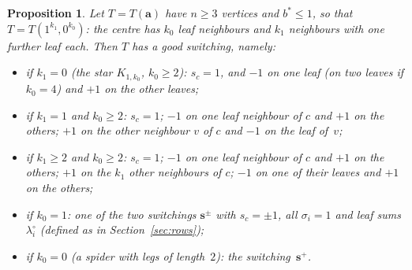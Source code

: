 \documentclass[11pt]{article}
\numberwithin{equation}{section}
\newtheorem{proposition}[lemma]{Proposition}
\theoremstyle{remark}
\newcommand{\s}{\mathbf s}
\newcommand{\bfa}{\mathbf a}
\begin{document}
\begin{proposition}\label{prop:small}
Let $T=T(\bfa)$ have $n\ge3$ vertices and $b^*\le1$, so that
$T=T(1^{k_1},0^{k_0})$: the centre has $k_0$ leaf neighbours and $k_1$
neighbours with one further leaf each. Then $T$ has a good switching, namely:
\begin{itemize}
\item[(a)] if $k_1=0$ (the star $K_{1,k_0}$, $k_0\ge2$): $s_c=1$, and $-1$ on one
 leaf (on two leaves if $k_0=4$) and $+1$ on the other leaves;
\item[(b)] if $k_1=1$ and $k_0\ge2$: $s_c=1$; $-1$ on one leaf neighbour of $c$
 and $+1$ on the others; $+1$ on the other neighbour $v$ of $c$ and $-1$ on the
 leaf of~$v$;
\item[(c)] if $k_1\ge2$ and $k_0\ge2$: $s_c=1$; $-1$ on one leaf neighbour of
 $c$ and $+1$ on the others; $+1$ on the $k_1$ other neighbours of $c$; $-1$ on
 one of their leaves and $+1$ on the others;
\item[(d)] if $k_0=1$: one of the two switchings $\s^{\pm}$ with $s_c=\pm1$,
 all $\sigma_i=1$ and leaf sums $\lambda^\circ_i$ (defined as in
Section~\ref{sec:rows});
\item[(e)] if $k_0=0$ (a spider with legs of length~$2$): the switching~$\s^+$.
\end{itemize}
\end{proposition}
\end{document}
